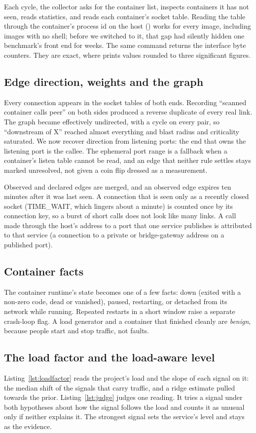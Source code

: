 Each cycle, the collector asks for the container list, inspects containers it has not seen, reads statistics, and reads each container's socket table. Reading the table through the container's process id on the host () works for every image, including images with no shell; before we switched to it, that gap had silently hidden one benchmark's front end for weeks. The same command returns the interface byte counters. They are exact, where  prints values rounded to three significant figures.

\subsection{Edge direction, weights and the graph}
Every connection appears in the socket tables of both ends. Recording ``scanned container calls peer'' on both sides produced a reverse duplicate of every real link. The graph became effectively undirected, with a cycle on every pair, so ``downstream of X'' reached almost everything and blast radius and criticality saturated. We now recover direction from listening ports: the end that owns the listening port is the callee. The ephemeral port range is a fallback when a container's listen table cannot be read, and an edge that neither rule settles stays marked unresolved, not given a coin flip dressed as a measurement.

Observed and declared edges are merged, and an observed edge expires ten minutes after it was last seen. A connection that is seen only as a recently closed socket (TIME\_WAIT, which lingers about a minute) is counted once by its connection key, so a burst of short calls does not look like many links. A call made through the host's address to a port that one service publishes is attributed to that service (a connection to a private or bridge-gateway address on a published port).

\subsection{Container facts}
The container runtime's state becomes one of a few facts: down (exited with a non-zero code, dead or vanished), paused, restarting, or detached from its network while running. Repeated restarts in a short window raise a separate crash-loop flag. A load generator and a container that finished cleanly are \emph{benign}, because people start and stop traffic, not faults.

\subsection{The load factor and the load-aware level}
Listing~\ref{lst:loadfactor} reads the project's load and the slope of each signal on it: the median shift of the signals that carry traffic, and a ridge estimate pulled towards the prior. Listing~\ref{lst:judge} judges one reading. It tries a signal under both hypotheses about how the signal follows the load and counts it as unusual only if neither explains it. The strongest signal sets the service's level and stays as the evidence.

